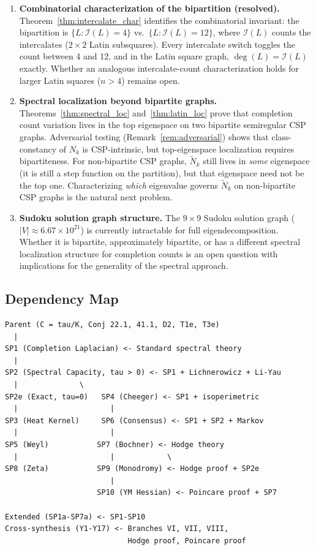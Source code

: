 \documentclass[11pt]{article}
\theoremstyle{definition}
\theoremstyle{remark}
\newcommand{\Ic}{\mathcal{I}}
\begin{document}
\begin{enumerate}[nosep]
\item \textbf{Combinatorial characterization of the bipartition (resolved).} Theorem~\ref{thm:intercalate_char} identifies the combinatorial invariant: the bipartition is $\{L : \Ic(L) = 4\}$ vs.\ $\{L : \Ic(L) = 12\}$, where $\Ic(L)$ counts the intercalates ($2 \times 2$ Latin subsquares). Every intercalate switch toggles the count between 4 and 12, and in the Latin square graph, $\deg(L) = \Ic(L)$ exactly. Whether an analogous intercalate-count characterization holds for larger Latin squares ($n > 4$) remains open.
\item \textbf{Spectral localization beyond bipartite graphs.} Theorems~\ref{thm:spectral_loc} and~\ref{thm:latin_loc} prove that completion count variation lives in the top eigenspace on two bipartite semiregular CSP graphs. Adversarial testing (Remark~\ref{rem:adversarial}) shows that class-constancy of $N_k$ is CSP-intrinsic, but top-eigenspace localization requires bipartiteness. For non-bipartite CSP graphs, $\tilde{N}_k$ still lives in \emph{some} eigenspace (it is still a step function on the partition), but that eigenspace need not be the top one. Characterizing \emph{which} eigenvalue governs $\tilde{N}_k$ on non-bipartite CSP graphs is the natural next problem.
\item \textbf{Sudoku solution graph structure.} The $9 \times 9$ Sudoku solution graph ($|V| \approx 6.67 \times 10^{21}$) is currently intractable for full eigendecomposition. Whether it is bipartite, approximately bipartite, or has a different spectral localization structure for completion counts is an open question with implications for the generality of the spectral approach.
\end{enumerate}

\subsection{Dependency Map}

\begin{verbatim}
Parent (C = tau/K, Conj 22.1, 41.1, D2, T1e, T3e)
  |
SP1 (Completion Laplacian) <- Standard spectral theory
  |
SP2 (Spectral Capacity, tau > 0) <- SP1 + Lichnerowicz + Li-Yau
  |              \
SP2e (Exact, tau=0)   SP4 (Cheeger) <- SP1 + isoperimetric
  |                     |
SP3 (Heat Kernel)     SP6 (Consensus) <- SP1 + SP2 + Markov
  |                     |
SP5 (Weyl)           SP7 (Bochner) <- Hodge theory
  |                     |            \
SP8 (Zeta)           SP9 (Monodromy) <- Hodge proof + SP2e
                        |
                     SP10 (YM Hessian) <- Poincare proof + SP7

Extended (SP1a-SP7a) <- SP1-SP10
Cross-synthesis (Y1-Y17) <- Branches VI, VII, VIII,
                            Hodge proof, Poincare proof
\end{verbatim}
\end{document}

